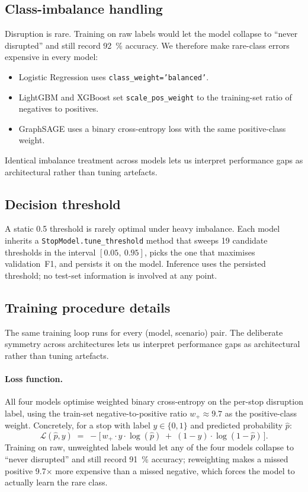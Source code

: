 \subsection{Class-imbalance handling}

Disruption is rare. Training on raw labels would let the model collapse to ``never disrupted'' and still record \SI{92}{\percent} accuracy. We therefore make rare-class errors expensive in every model:

\begin{itemize}
    \item Logistic Regression uses \texttt{class\_weight='balanced'}.
    \item LightGBM and XGBoost set \texttt{scale\_pos\_weight} to the training-set ratio of negatives to positives.
    \item GraphSAGE uses a binary cross-entropy loss with the same positive-class weight.
\end{itemize}

Identical imbalance treatment across models lets us interpret performance gaps as architectural rather than tuning artefacts.

\subsection{Decision threshold}

A static \num{0.5} threshold is rarely optimal under heavy imbalance. Each model inherits a \texttt{StopModel.tune\_threshold} method that sweeps 19 candidate thresholds in the interval $[0.05,~0.95]$, picks the one that maximises validation~F1, and persists it on the model. Inference uses the persisted threshold; no test-set information is involved at any point.

\subsection{Training procedure details}
\label{sec:training-details}

The same training loop runs for every (model, scenario) pair. The deliberate symmetry across architectures lets us interpret performance gaps as architectural rather than tuning artefacts.

\paragraph{Loss function.} All four models optimise weighted binary cross-entropy on the per-stop disruption label, using the train-set negative-to-positive ratio $w_+ \approx 9.7$ as the positive-class weight. Concretely, for a stop with label $y \in \{0, 1\}$ and predicted probability $\hat{p}$:
\begin{equation}
    \mathcal{L}(\hat{p}, y) \;=\; -\bigl[\, w_+ \cdot y \cdot \log(\hat{p}) \;+\; (1 - y) \cdot \log(1 - \hat{p}) \,\bigr].
\end{equation}
Training on raw, unweighted labels would let any of the four models collapse to ``never disrupted'' and still record \SI{91}{\percent} accuracy; reweighting makes a missed positive 9.7$\times$ more expensive than a missed negative, which forces the model to actually learn the rare class.

